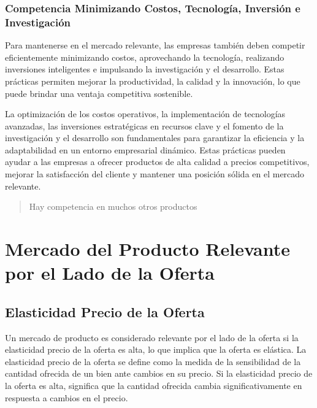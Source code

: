 \documentclass[
  a4paper,
]{article}
\begin{document}
\hypertarget{competencia-minimizando-costos-tecnologuxeda-inversiuxf3n-e-investigaciuxf3n}{%
\subsubsection{Competencia Minimizando Costos, Tecnología, Inversión e
Investigación}\label{competencia-minimizando-costos-tecnologuxeda-inversiuxf3n-e-investigaciuxf3n}}

Para mantenerse en el mercado relevante, las empresas también deben
competir eficientemente minimizando costos, aprovechando la tecnología,
realizando inversiones inteligentes e impulsando la investigación y el
desarrollo. Estas prácticas permiten mejorar la productividad, la
calidad y la innovación, lo que puede brindar una ventaja competitiva
sostenible.

La optimización de los costos operativos, la implementación de
tecnologías avanzadas, las inversiones estratégicas en recursos clave y
el fomento de la investigación y el desarrollo son fundamentales para
garantizar la eficiencia y la adaptabilidad en un entorno empresarial
dinámico. Estas prácticas pueden ayudar a las empresas a ofrecer
productos de alta calidad a precios competitivos, mejorar la
satisfacción del cliente y mantener una posición sólida en el mercado
relevante.

\begin{quote}
Hay competencia en muchos otros productos
\end{quote}

\hypertarget{mercado-del-producto-relevante-por-el-lado-de-la-oferta}{%
\section{Mercado del Producto Relevante por el Lado de la
Oferta}\label{mercado-del-producto-relevante-por-el-lado-de-la-oferta}}

\hypertarget{elasticidad-precio-de-la-oferta}{%
\subsection{Elasticidad Precio de la
Oferta}\label{elasticidad-precio-de-la-oferta}}

Un mercado de producto es considerado relevante por el lado de la oferta
si la elasticidad precio de la oferta es alta, lo que implica que la
oferta es elástica. La elasticidad precio de la oferta se define como la
medida de la sensibilidad de la cantidad ofrecida de un bien ante
cambios en su precio. Si la elasticidad precio de la oferta es alta,
significa que la cantidad ofrecida cambia significativamente en
respuesta a cambios en el precio.
\end{document}

